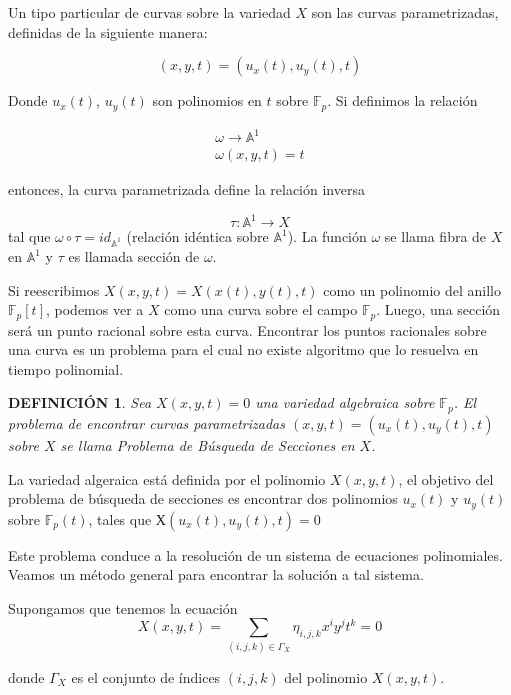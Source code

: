 \documentclass[12pt]{article}
\newcommand{\tto}{\longrightarrow}
\newtheorem{definicion}{D{\footnotesize EFINICI\'ON}}
\begin{document}
Un tipo particular de curvas sobre la variedad $X$ son las curvas parametrizadas, definidas de la siguiente manera:

$$(x, y, t) = (u_x (t), u_y (t), t)$$

Donde $u_x (t)$, $u_y (t)$ son polinomios en $t$ sobre  $\mathbb{F}_p$. Si definimos la relación 

\begin{eqnarray*}
\omega\tto\mathbb{A}^{1}\\
\omega(x, y, t)=t
\end{eqnarray*}

entonces, la curva parametrizada define la relaci\'on inversa

$$\tau:\mathbb{A}^{1} \tto  X$$
tal que $\omega \circ\tau = id_{\mathbb{A}^{1}}$ (relaci\'on id\'entica sobre $\mathbb{A}^{1}$). La funci\'on $\omega$ se llama fibra de $X$ en $\mathbb{A}^{1}$ y $\tau$  es llamada secci\'on de $\omega$.


Si reescribimos $X (x, y, t)=X(x(t),y(t),t)$ como un polinomio del anillo $ \mathbb{F}_p[t]$, podemos ver a $X$ como una curva sobre el campo $\mathbb{F}_p$. Luego, una secci\'on ser\'a un punto racional sobre esta curva. Encontrar los puntos racionales sobre una curva es un problema para el cual no existe algoritmo que lo resuelva en tiempo polinomial.



\begin{definicion}
Sea $X(x, y, t) = 0$  una variedad algebraica sobre $ \mathbb{F}_p$. El problema  de encontrar curvas parametrizadas $(x, y, t) = (u_x (t), u_y (t), t)$ sobre $X$ se llama Problema de B\'usqueda de Secciones en $X$.
\end{definicion}

La variedad algeraica est\'a definida por el polinomio $X (x, y, t)$, el objetivo del problema de b\'usqueda de secciones es encontrar dos polinomios $u_x(t)$ y $u_y(t)$ sobre $\mathbb{F}_p(t)$, tales que  $Х (u_x(t), u_y(t),t) = 0$
 
 
 Este problema conduce a la resoluci\'on de un sistema de ecuaciones polinomiales. Veamos un m\'etodo general para encontrar la soluci\'on a tal sistema.
 
 
Supongamos que tenemos la ecuaci\'on
\begin{equation}\label{uno}
X(x, y, t) = \sum_{(i,j,k)\in\Gamma_X} \eta_{i,j,k} x^i y^j t^k = 0
\end{equation}

donde $\Gamma_X$  es el conjunto de \'indices $(i, j, k)$ del polinomio $X (x, y, t)$.
\end{document}

